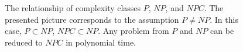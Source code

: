 \begin{figure}
\centering



\caption{The relationship of complexity classes $P$, $NP$, and $NPC$.
The presented picture corresponds to the assumption $P \ne NP$. In this
case, $P \subset NP$, $NPC \subset NP$. Any problem from $P$ and $NP$
can be reduced to $NPC$ in polynomial time.
} 
\label{figAddAlgoPNP}
\end{figure}